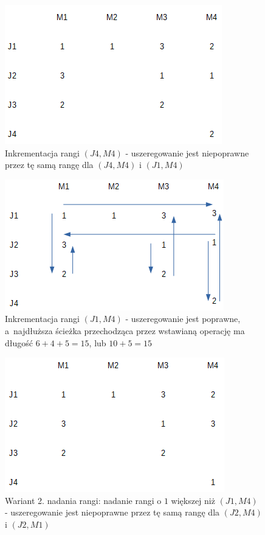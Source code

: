 \documentclass[brudnopis]{xmgr}
\begin{document}
\begin{figure}[!tbh]
\centering
\includegraphics[width=.7\hsize]{fig/1_1.png}
\caption{Inkrementacja rangi $(J4, M4)$ - uszeregowanie jest niepoprawne przez tę samą rangę dla $(J4, M4)$ i $(J1, M4)$\label{diag:state1_1}}
\end{figure}\medskip

\begin{figure}[!tbh]
\centering
\includegraphics[width=.7\hsize]{fig/1.png}
\caption{Inkrementacja rangi $(J1, M4)$ - uszeregowanie jest poprawne, a~najdłuższa ścieżka przechodząca przez wstawianą operację ma długość $6 + 4 + 5 = 15$, lub $10 + 5 = 15$\label{diag:state1}}
\end{figure}\medskip
 
\begin{figure}[!tbh]
\centering
\includegraphics[width=.7\hsize]{fig/3_1.png}
\caption{Wariant 2. nadania rangi: nadanie rangi o $1$ większej niż $(J1, M4)$ - uszeregowanie jest niepoprawne przez tę samą rangę dla $(J2, M4)$ i $(J2, M1)$\label{diag:state3_1}}
\end{figure}\medskip
\end{document}
